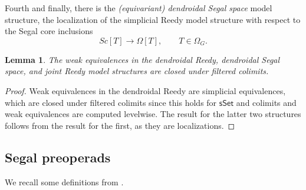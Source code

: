 \documentclass[a4paper,10pt
,draft
]{article}%
\numberwithin{equation}{section}
\numberwithin{figure}{section}
\newtheorem{lemma}[equation]{Lemma}%
\theoremstyle{definition} %
\newcommand{\longto}{\longrightarrow}%
\newcommand{\sSet}{\ensuremath{\mathsf{sSet}}}%
\newcommand{\1}{\ensuremath{\mathbbm 1}}%
\begin{document}
Fourth and finally, there is the \textit{(equivariant) dendroidal Segal space} model structure,
the localization of the simplicial Reedy model structure with respect to the Segal core inclusions
\[
      Sc[T] \longto \Omega[T],
      \qquad
      T \in \Omega_G.
\]

\begin{lemma}
      \label{FCOLIM_WE_LEM}
      The weak equivalences in the dendroidal Reedy, dendroidal Segal space, and joint Reedy model structures are closed under filtered colimits.
\end{lemma}
\begin{proof}
      Weak equivalences in the dendroidal Reedy are simplicial equivalences, which are closed under filtered colimits
      since this holds for $\sSet$ and colimits and weak equivalences are computed levelwise.
      The result for the latter two structures follows from the result for the first, as they are localizations.
\end{proof}



\subsection{Segal preoperads}
\label{SPREOP_SEC}

We recall some definitions from \cite[\S4,5]{BP_edss}.
\end{document}
